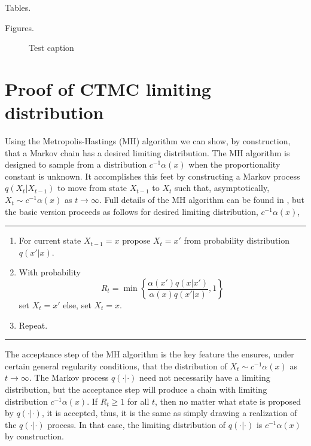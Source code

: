 \documentclass[12pt]{article}
\begin{document}


\clearpage

Tables.

\clearpage

Figures.

\begin{figure}
\caption{Test caption}
\end{figure}


\clearpage

\appendix 

\section{Proof of CTMC limiting distribution}

Using the Metropolis-Hastings (MH) algorithm we can show, by construction, that a Markov chain has a desired limiting distribution. The MH algorithm is designed to sample from a distribution $c^{-1}\alpha(x)$ when the proportionality constant is unknown. It accomplishes this feet by constructing a Markov process $q(X_t|X_{t-1})$ to move from state $X_{t-1}$ to $X_t$ such that, asymptotically, $X_t \sim c^{-1}\alpha(x)$ as $t\to \infty$. Full details of the MH algorithm can be found in \cite{chib1995understanding}, but the basic version proceeds as follows for desired limiting distribution, $c^{-1}\alpha(x)$, \bigskip
\hrule
\begin{enumerate}
\item For current state $X_{t-1} = x$ propose $X_t = x'$ from probability distribution $q(x'|x)$.
\item With probability 
\[
R_t = \min \left\{ \frac{\alpha(x')q(x|x')}{\alpha(x)q(x'|x)}, 1 \right\}
\]
set $X_t = x'$ else, set $X_t = x$. 
\item Repeat. 
\end{enumerate}
\hrule \bigskip
The acceptance step of the MH algorithm is the key feature the ensures, under certain general regularity conditions, that the distribution of $X_t \sim c^{-1}\alpha(x)$ as $t\to \infty$. The Markov process $q(\cdot|\cdot)$ need not necessarily have a limiting distribution, but the acceptance step will produce a chain with limiting distribution $c^{-1}\alpha(x)$. If $R_t \ge 1$ for all $t$, then no matter what state is proposed by $q(\cdot|\cdot)$, it is accepted, thus, it is the same as simply drawing a realization of the $q(\cdot|\cdot)$ process. In that case, the limiting distribution of $q(\cdot|\cdot)$ is $c^{-1}\alpha(x)$ by construction.
\end{document}
